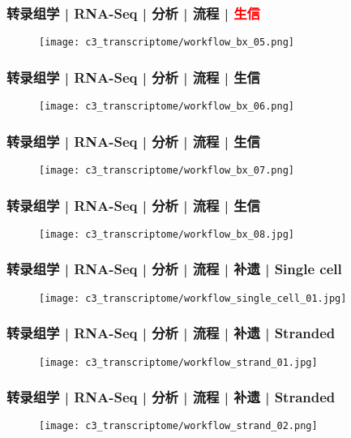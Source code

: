 \begin{frame}
  \frametitle{转录组学 | RNA-Seq | 分析 | 流程 | \textcolor{red}{生信}}
  \begin{figure}
    \centering
    \texttt{[image: c3\_transcriptome/workflow\_bx\_05.png]}
  \end{figure}
\end{frame}

\begin{frame}
  \frametitle{转录组学 | RNA-Seq | 分析 | 流程 | 生信}
  \begin{figure}
    \centering
    \texttt{[image: c3\_transcriptome/workflow\_bx\_06.png]}
  \end{figure}
\end{frame}

\begin{frame}
  \frametitle{转录组学 | RNA-Seq | 分析 | 流程 | 生信}
  \begin{figure}
    \centering
    \texttt{[image: c3\_transcriptome/workflow\_bx\_07.png]}
  \end{figure}
\end{frame}

\begin{frame}
  \frametitle{转录组学 | RNA-Seq | 分析 | 流程 | 生信}
  \begin{figure}
    \centering
    \texttt{[image: c3\_transcriptome/workflow\_bx\_08.jpg]}
  \end{figure}
\end{frame}

\begin{frame}
  \frametitle{转录组学 | RNA-Seq | 分析 | 流程 | 补遗 | Single cell}
  \begin{figure}
    \centering
    \texttt{[image: c3\_transcriptome/workflow\_single\_cell\_01.jpg]}
  \end{figure}
\end{frame}

\begin{frame}
  \frametitle{转录组学 | RNA-Seq | 分析 | 流程 | 补遗 | Stranded}
  \begin{figure}
    \centering
    \texttt{[image: c3\_transcriptome/workflow\_strand\_01.jpg]}
  \end{figure}
\end{frame}

\begin{frame}
  \frametitle{转录组学 | RNA-Seq | 分析 | 流程 | 补遗 | Stranded}
  \begin{figure}
    \centering
    \texttt{[image: c3\_transcriptome/workflow\_strand\_02.png]}
  \end{figure}
\end{frame}

